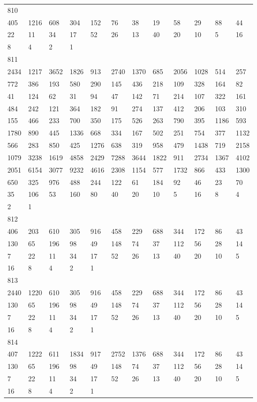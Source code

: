\begin{longtable}{llllllllllll}
810&&&&&&&&&&&\\
405& 1216& 608& 304& 152& 76& 38& 19& 58& 29& 88& 44\\
22& 11& 34& 17& 52& 26& 13& 40& 20& 10& 5& 16\\
8& 4& 2& 1& \\

811&&&&&&&&&&&\\
2434& 1217& 3652& 1826& 913& 2740& 1370& 685& 2056& 1028& 514& 257\\
772& 386& 193& 580& 290& 145& 436& 218& 109& 328& 164& 82\\
41& 124& 62& 31& 94& 47& 142& 71& 214& 107& 322& 161\\
484& 242& 121& 364& 182& 91& 274& 137& 412& 206& 103& 310\\
155& 466& 233& 700& 350& 175& 526& 263& 790& 395& 1186& 593\\
1780& 890& 445& 1336& 668& 334& 167& 502& 251& 754& 377& 1132\\
566& 283& 850& 425& 1276& 638& 319& 958& 479& 1438& 719& 2158\\
1079& 3238& 1619& 4858& 2429& 7288& 3644& 1822& 911& 2734& 1367& 4102\\
2051& 6154& 3077& 9232& 4616& 2308& 1154& 577& 1732& 866& 433& 1300\\
650& 325& 976& 488& 244& 122& 61& 184& 92& 46& 23& 70\\
35& 106& 53& 160& 80& 40& 20& 10& 5& 16& 8& 4\\
2& 1& \\

812&&&&&&&&&&&\\
406& 203& 610& 305& 916& 458& 229& 688& 344& 172& 86& 43\\
130& 65& 196& 98& 49& 148& 74& 37& 112& 56& 28& 14\\
7& 22& 11& 34& 17& 52& 26& 13& 40& 20& 10& 5\\
16& 8& 4& 2& 1& \\

813&&&&&&&&&&&\\
2440& 1220& 610& 305& 916& 458& 229& 688& 344& 172& 86& 43\\
130& 65& 196& 98& 49& 148& 74& 37& 112& 56& 28& 14\\
7& 22& 11& 34& 17& 52& 26& 13& 40& 20& 10& 5\\
16& 8& 4& 2& 1& \\

814&&&&&&&&&&&\\
407& 1222& 611& 1834& 917& 2752& 1376& 688& 344& 172& 86& 43\\
130& 65& 196& 98& 49& 148& 74& 37& 112& 56& 28& 14\\
7& 22& 11& 34& 17& 52& 26& 13& 40& 20& 10& 5\\
16& 8& 4& 2& 1& \\


\end{longtable}

